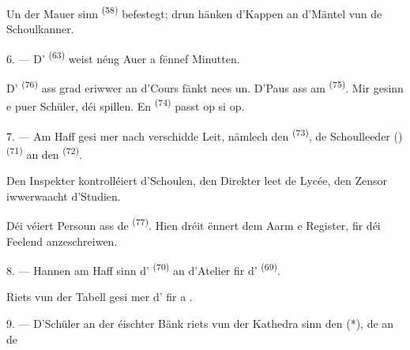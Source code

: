 Un der Mauer sinn  \textsuperscript{(58)} befestegt; drun hänken
d'Kappen an d'Mäntel vun de Schoulkanner.

\VUsaut{5.2mm}
\VUsaut{3.6mm}

6. --- D' \textsuperscript{(63)} weist néng Auer a fënnef Minutten.

D' \textsuperscript{(76)} ass grad eriwwer an d'Cours fänkt nees un.
D'Paus ass am  \textsuperscript{(75)}. Mir gesinn e puer Schüler, déi
spillen. En  \textsuperscript{(74)} passt op si op.

7. --- Am Haff gesi mer nach verschidde Leit, nämlech den 
\textsuperscript{(73)}, de Schoulleeder ()
\textsuperscript{(71)} an den  \textsuperscript{(72)}.

Den Inspekter kontrolléiert d'Schoulen, den Direkter leet de Lycée, den Zensor
iwwerwaacht d'Studien.

Déi véiert Persoun ass de  \textsuperscript{(77)}. Hien dréit ënnert
dem Aarm e Register, fir déi Feelend anzeschreiwen.

8. --- Hannen am Haff sinn d' \textsuperscript{(70)} an d'Atelier
fir d' \textsuperscript{(69)}.

Riets vun der Tabell gesi mer d' fir  a
.


\VUsaut{2.4mm}

\VUsaut{3.0mm}

9. --- D'Schüler an der éischter Bänk riets vun der Kathedra sinn den 
(*), de  an de 

